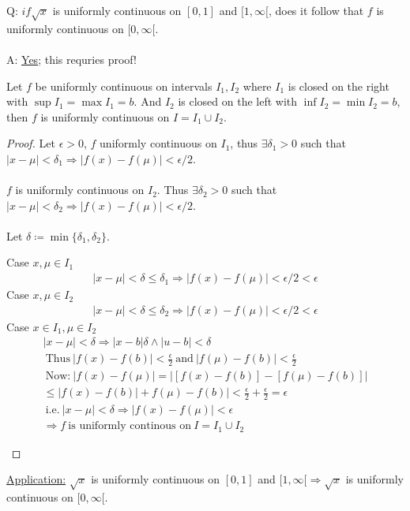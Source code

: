 \documentclass[class=scrartcl, crop=false]{standalone}
\begin{document}
Q: $if \sqrt{x}$ is uniformly continuous on $[0, 1]$ and $[1, \infty[$, does it follow that $f$ is uniformly continuous on $[0, \infty[$.
\\\\
A: \ul{Yes}; this requries proof!

\begin{theorem}
  Let $f$ be uniformly continuous on intervals $I_1, I_2$ where $I_1$ is closed on the right with $\sup I_1 = \max I_1 = b$. And $I_2$ is closed on the left with $\inf I_2 = \min I_2 = b$, then $f$ is uniformly continuous on $I = I_1 \cup I_2$.
  \begin{proof}
    Let $\epsilon > 0$, $f$ uniformly continuous on $I_1$, thus $\exists \delta_1 > 0$ such that $|x - \mu| < \delta_1 \Rightarrow |f(x) - f(\mu)| < \epsilon / 2$.
    \\\\
    $f$ is uniformly continuous on $I_2$. Thus $\exists \delta_2 > 0$ such that $|x - \mu| < \delta_2 \Rightarrow |f(x) - f(\mu)| < \epsilon / 2$.
    \\\\
    Let $\delta \coloneqq \min\{\delta_1, \delta_2\}$.
    \begin{enumerate}
      \ii Case $x, \mu \in I_1$ 
      \begin{gather*}
        |x - \mu| < \delta \leq \delta_1 \Rightarrow |f(x) - f(\mu)| < \epsilon / 2 < \epsilon
      \end{gather*} 
      \ii Case $x, \mu \in I_2$ 
      \begin{gather*}
        |x - \mu| < \delta \leq \delta_2 \Rightarrow |f(x) - f(\mu)| < \epsilon / 2 < \epsilon 
      \end{gather*} 
      \ii Case $x \in I_1, \mu \in I_2$
      \begin{gather*}
        |x - \mu| < \delta \Rightarrow |x - b| \delta \wedge |u - b| < \delta
        \\
        \ \text{Thus} \ |f(x) - f(b)| < \frac{\epsilon}{2} \ \text{and} \ |f(\mu) - f(b)| < \frac{\epsilon}{2}
        \\
        \ \text{Now:} \ |f(x) - f(\mu)| = |[f(x) - f(b)] - [f(\mu) - f(b)]|
        \\
        \leq |f(x) - f(b)| + f(\mu) - f(b)| < \frac{\epsilon}{2} + \frac{\epsilon}{2} = \epsilon
        \\
        \ \text{i.e.} \ |x - \mu| < \delta \Rightarrow |f(x) - f(\mu)| < \epsilon
        \\
        \Rightarrow f \ \text{is uniformly continous on} \ I = I_1 \cup I_2
      \end{gather*} 
    \end{enumerate} 
  \end{proof} 
  \ul{Application:} $\sqrt{x}$ is uniformly continuous on $[0, 1]$ and $[1, \infty[ \Rightarrow \sqrt{x}$ is uniformly continuous on $[0, \infty[$.
\end{theorem} 
\end{document}
